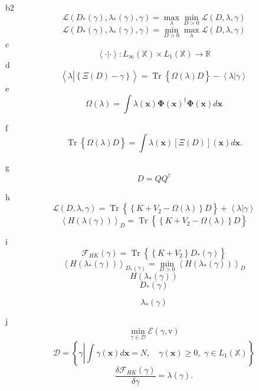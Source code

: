 \documentclass[aps,preprint]{revtex4}%
\begin{document}
b2%
\[
\mathcal{L}\left(  D_{\ast}\left(  \gamma\right)  ,\lambda_{\ast}\left(
\gamma\right)  ,\gamma\right)  =\max_{\lambda}\min_{D>0}\mathcal{L}\left(
D,\lambda,\gamma\right)
\]%
\[
\mathcal{L}\left(  D_{\ast}\left(  \gamma\right)  ,\lambda_{\ast}\left(
\gamma\right)  ,\gamma\right)  =\min_{D>0}\max_{\lambda}\mathcal{L}\left(
D,\lambda,\gamma\right)
\]
c%
\[
\left\langle \cdot|\cdot\right\rangle :L_{\infty}\left(  \mathbb{X}\right)
\times L_{1}\left(  \mathbb{X}\right)  \rightarrow\mathbb{R}%
\]
d%
\[
\left\langle \lambda\left\vert \overset{}{\left\{  \Xi\left(  D\right)
-\gamma\right\}  }\right.  \right\rangle =\operatorname{Tr}\left\{  \overset
{}{\Omega\left(  \lambda\right)  D}\right\}  -\left\langle \lambda\left\vert
\gamma\right.  \right\rangle
\]
e%
\[
\Omega\left(  \lambda\right)  =\int\lambda\left(  \mathbf{x}\right)
\mathbf{\Phi}\left(  \mathbf{x}\right)  ^{\dagger}\mathbf{\Phi}\left(
\mathbf{x}\right)  d\mathbf{x}%
\]


f%
\[
\operatorname{Tr}\left\{  \overset{}{\Omega\left(  \lambda\right)  D}\right\}
=\int\lambda\left(  \mathbf{x}\right)  \left[  \Xi\left(  D\right)  \right]
\left(  \mathbf{x}\right)  d\mathbf{x.}%
\]


g%
\[
D=QQ^{\dagger}%
\]


h%
\[
\mathcal{L}\left(  D,\lambda,\gamma\right)  =\operatorname{Tr}\left\{
\overset{}{\left\{  K+V_{2}-\Omega\left(  \lambda\right)  \right\}
D}\right\}  +\left\langle \lambda\left\vert \gamma\right.  \right\rangle
\]%
\[
\left\langle H\left(  \lambda\left(  \gamma\right)  \right)  \right\rangle
_{D}=\operatorname{Tr}\left\{  \overset{}{\left\{  K+V_{2}-\Omega\left(
\lambda\right)  \right\}  D}\right\}
\]


i%
\[
\mathcal{F}_{HK}\left(  \gamma\right)  =\operatorname{Tr}\left\{  \overset
{}{\left\{  K+V_{2}\right\}  D_{\ast}\left(  \gamma\right)  }\right\}
\]%
\[
\left\langle H\left(  \lambda_{\ast}\left(  \gamma\right)  \right)
\right\rangle _{D_{\ast}\left(  \gamma\right)  }=\min_{D>0}\left\langle
H\left(  \lambda_{\ast}\left(  \gamma\right)  \right)  \right\rangle _{D}%
\]%
\[
H\left(  \lambda_{\ast}\left(  \gamma\right)  \right)
\]%
\[
D_{\ast}\left(  \gamma\right)
\]
%

\[
\lambda_{\ast}\left(  \gamma\right)
\]


j%
\[
\min_{\gamma\in\mathcal{D}}\mathcal{E}\left(  \gamma\mathbf{,}\mathrm{v}%
\right)
\]%
\[
\mathcal{D}=\left\{  \gamma\left\vert \int\gamma\left(  \mathbf{x}\right)
d\mathbf{x}=N,\quad\gamma\left(  \mathbf{x}\right)  \geq0,\,\,\gamma\in
L_{1}\left(  \mathbb{X}\right)  \right.  \right\}
\]%
\[
\frac{\delta\mathcal{F}_{HK}\left(  \gamma\right)  }{\delta\gamma}%
=\lambda\left(  \gamma\right)  .
\]
\end{document}
